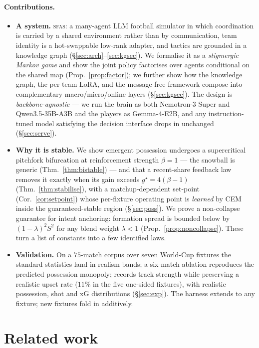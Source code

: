 \documentclass[11pt]{article}
\theoremstyle{definition}
\theoremstyle{remark}
\newcommand{\sfas}{\textsc{sfas}}
\begin{document}
\paragraph{Contributions.}
\begin{itemize}
\item \textbf{A system.} \sfas{}: a many-agent LLM football simulator in which coordination is carried by a shared environment rather than by communication, team identity is a hot-swappable low-rank adapter, and tactics are grounded in a knowledge graph (\S\ref{sec:arch}--\ref{sec:kgsec}). We formalise it as a \emph{stigmergic Markov game} and show the joint policy factorises over agents conditional on the shared map (Prop.~\ref{prop:factor}); we further show how the knowledge graph, the per-team LoRA, and the message-free framework compose into complementary macro/micro/online layers (\S\ref{sec:kgsec}). The design is \emph{backbone-agnostic} --- we run the brain as both Nemotron-3 Super and Qwen3.5-35B-A3B and the players as Gemma-4-E2B, and any instruction-tuned model satisfying the decision interface drops in unchanged (\S\ref{sec:serve}).
\item \textbf{Why it is stable.} We show emergent possession undergoes a supercritical pitchfork bifurcation at reinforcement strength $\beta=1$ --- the snowball is generic (Thm.~\ref{thm:bistable}) --- and that a recent-share feedback law removes it exactly when its gain exceeds $g^\star=4(\beta-1)$ (Thm.~\ref{thm:stabilise}), with a matchup-dependent set-point (Cor.~\ref{cor:setpoint}) whose per-fixture operating point is \emph{learned} by CEM inside the guaranteed-stable region (\S\ref{sec:poss}). We prove a non-collapse guarantee for intent anchoring: formation spread is bounded below by $(1-\lambda)^2S^2$ for any blend weight $\lambda<1$ (Prop.~\ref{prop:noncollapse}). These turn a list of constants into a few identified laws.
\item \textbf{Validation.} On a $75$-match corpus over seven World-Cup fixtures the standard statistics land in realism bands; a six-match ablation reproduces the predicted possession monopoly; records track strength while preserving a realistic upset rate ($11\%$ in the five one-sided fixtures), with realistic possession, shot and xG distributions (\S\ref{sec:exp}). The harness extends to any fixture; new fixtures fold in additively.
\end{itemize}

\section{Related work}\label{sec:related}
\end{document}
